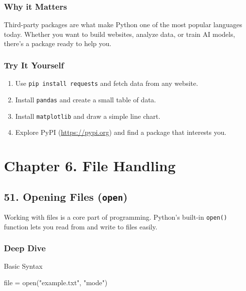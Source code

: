 \documentclass[
  letterpaper,
  DIV=11,
  numbers=noendperiod]{scrreprt}
\newenvironment{Shaded}{\begin{snugshade}}{\end{snugshade}}
\newcommand{\BuiltInTok}[1]{\textcolor[rgb]{0.00,0.23,0.31}{#1}}
\newcommand{\NormalTok}[1]{\textcolor[rgb]{0.00,0.23,0.31}{#1}}
\newcommand{\OperatorTok}[1]{\textcolor[rgb]{0.37,0.37,0.37}{#1}}
\newcommand{\StringTok}[1]{\textcolor[rgb]{0.13,0.47,0.30}{#1}}
\providecommand{\tightlist}{%
  \setlength{\itemsep}{0pt}\setlength{\parskip}{0pt}}
\begin{document}
\subsubsection{Why it Matters}\label{why-it-matters-49}

Third-party packages are what make Python one of the most popular
languages today. Whether you want to build websites, analyze data, or
train AI models, there's a package ready to help you.

\subsubsection{Try It Yourself}\label{try-it-yourself-49}

\begin{enumerate}
\def\labelenumi{\arabic{enumi}.}
\tightlist
\item
  Use \texttt{pip\ install\ requests} and fetch data from any website.
\item
  Install \texttt{pandas} and create a small table of data.
\item
  Install \texttt{matplotlib} and draw a simple line chart.
\item
  Explore PyPI (\url{https://pypi.org}) and find a package that
  interests you.
\end{enumerate}

\section{Chapter 6. File Handling}\label{chapter-6.-file-handling}

\subsection{\texorpdfstring{51. Opening Files
(\texttt{open})}{51. Opening Files (open)}}\label{opening-files-open}

Working with files is a core part of programming. Python's built-in
\texttt{open()} function lets you read from and write to files easily.

\subsubsection{Deep Dive}\label{deep-dive-50}

Basic Syntax

\begin{Shaded}
\begin{Highlighting}[]
\BuiltInTok{file} \OperatorTok{=} \BuiltInTok{open}\NormalTok{(}\StringTok{"example.txt"}\NormalTok{, }\StringTok{"mode"}\NormalTok{)}
\end{Highlighting}
\end{Shaded}
\end{document}
